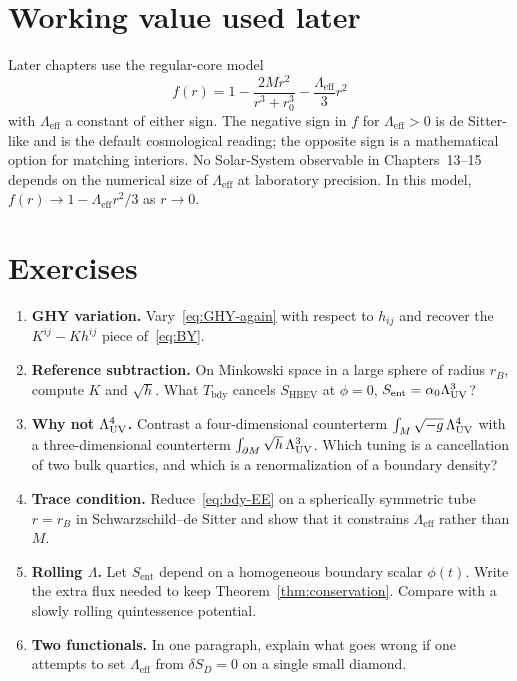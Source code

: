 \section{Working value used later}
\label{sec:ch12-working}

Later chapters use the regular-core model
\begin{equation}
  \label{eq:fr-with-L}
  f(r)
  =1-\frac{2M r^2}{r^3+r_0^3}
   -\frac{\Lambda_{\mathrm{eff}}}{3}r^2
\end{equation}
with \(\Lambda_{\mathrm{eff}}\) a constant of either sign. The
negative sign in \(f\) for \(\Lambda_{\mathrm{eff}}>0\) is
de Sitter-like and is the default cosmological reading; the
opposite sign is a mathematical option for matching interiors. No
Solar-System observable in Chapters~13--15 depends on the numerical
size of \(\Lambda_{\mathrm{eff}}\) at laboratory precision. In this
model, \(f(r)\to1-\Lambda_{\mathrm{eff}}r^2/3\) as \(r\to0\).

\section{Exercises}
\label{sec:ch12-exercises}

\begin{enumerate}
  \item \textbf{GHY variation.}
    Vary~\eqref{eq:GHY-again} with respect to \(h_{ij}\) and
    recover the \(K^{ij}-Kh^{ij}\) piece of~\eqref{eq:BY}.
  \item \textbf{Reference subtraction.}
    On Minkowski space in a large sphere of radius \(r_B\),
    compute \(K\) and \(\sqrt{h}\). What \(T_{\mathrm{bdy}}\)
    cancels \(S_{\mathrm{HBEV}}\) at \(\phi=0\),
    \(S_{\mathrm{ent}}=\alpha_0\Lambda_{\mathrm{UV}}^3\)?
  \item \textbf{Why not \(\Lambda_{\mathrm{UV}}^4\).}
    Contrast a four-dimensional counterterm
    \(\int_M\sqrt{-g}\,\Lambda_{\mathrm{UV}}^4\) with a three-dimensional
    counterterm \(\int_{\partial M}\sqrt{h}\,\Lambda_{\mathrm{UV}}^3\). Which
    tuning is a cancellation of two bulk quartics, and which is
    a renormalization of a boundary density?
  \item \textbf{Trace condition.}
    Reduce~\eqref{eq:bdy-EE} on a spherically symmetric tube
    \(r=r_B\) in Schwarzschild--de Sitter and show that it
    constrains \(\Lambda_{\mathrm{eff}}\) rather than \(M\).
  \item \textbf{Rolling \(\Lambda\).}
    Let \(S_{\mathrm{ent}}\) depend on a homogeneous boundary
    scalar \(\phi(t)\). Write the extra flux needed to keep
    Theorem~\ref{thm:conservation}. Compare with a slowly
    rolling quintessence potential.
  \item \textbf{Two functionals.}
    In one paragraph, explain what goes wrong if one attempts to
    set \(\Lambda_{\mathrm{eff}}\) from \(\delta S_D=0\) on a
    single small diamond.
\end{enumerate}

